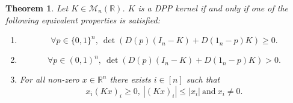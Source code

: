 \documentclass{article}
\numberwithin{equation}{section}
\renewcommand{\leq}{\leqslant}
\renewcommand{\geq}{\geqslant}
\newcommand{\bR}{\mathbb{R}}
\theoremstyle{plain}
\newtheorem{theorem}[proposition]{Theorem}
\begin{document}
\begin{theorem}\label{theo: Caracterisation_DPPs}
Let $K\in\mathcal{M}_n(\bR)$. $K$ is a DPP kernel if and only if one of the following equivalent properties is satisfied:
\begin{enumerate}[label=(\alph*)]
\item \label{cara1} \begin{equation}\label{eq: cara1}
\forall p\in\{0, 1\}^n,~\det(D(p)(I_n-K)+D(1_n-p)K)\geq 0.
\end{equation}
\item \label{cara2} \begin{equation}\label{eq: cara2}
\forall p\in (0, 1)^n,~\det(D(p)(I_n-K)+D(1_n-p)K)> 0.
\end{equation}
\item For all non-zero $x\in\bR^n$ there exists $i\in [n]$ such that 
\[x_i(Kx)_i\geq 0,~|(Kx)_i|\leq|x_i|~\mbox{and}~x_i \neq 0.\] \label{cara3}
\end{enumerate}
\end{theorem}
\end{document}

